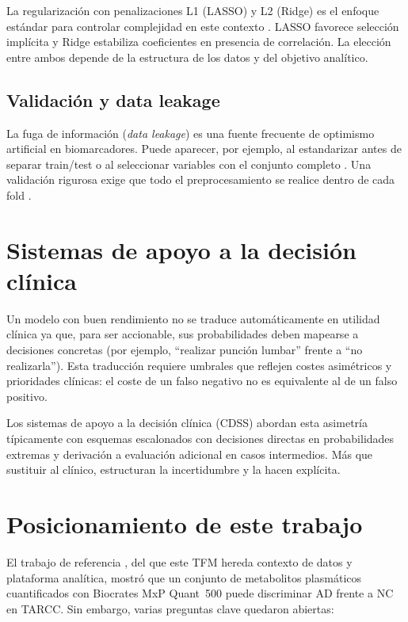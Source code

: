 La regularización con penalizaciones L1 (LASSO) \parencite{tibshirani1996regression} y L2 (Ridge) es el enfoque estándar para controlar complejidad en este contexto \parencite{hastie2009elements}. LASSO favorece selección implícita y Ridge estabiliza coeficientes en presencia de correlación. La elección entre ambos depende de la estructura de los datos y del objetivo analítico.

\subsection{Validación y data leakage}

La fuga de información (\textit{data leakage}) es una fuente frecuente de optimismo artificial en biomarcadores. Puede aparecer, por ejemplo, al estandarizar antes de separar train/test o al seleccionar variables con el conjunto completo \parencite{krstajic2014cross}. Una validación rigurosa exige que todo el preprocesamiento se realice dentro de cada fold \parencite{stone1974cross}.

\section{Sistemas de apoyo a la decisión clínica}

Un modelo con buen rendimiento no se traduce automáticamente en utilidad clínica ya que, para ser accionable, sus probabilidades deben mapearse a decisiones concretas (por ejemplo, ``realizar punción lumbar'' frente a ``no realizarla''). Esta traducción requiere umbrales que reflejen costes asimétricos y prioridades clínicas: el coste de un falso negativo no es equivalente al de un falso positivo.

Los sistemas de apoyo a la decisión clínica (CDSS) abordan esta asimetría típicamente con esquemas escalonados con decisiones directas en probabilidades extremas y derivación a evaluación adicional en casos intermedios. Más que sustituir al clínico, estructuran la incertidumbre y la hacen explícita.

\section{Posicionamiento de este trabajo}

El trabajo de referencia \parencite{bernal2025metabolomics}, del que este TFM hereda contexto de datos y plataforma analítica, mostró que un conjunto de metabolitos plasmáticos cuantificados con Biocrates MxP Quant~500 puede discriminar AD frente a NC en TARCC. Sin embargo, varias preguntas clave quedaron abiertas:


